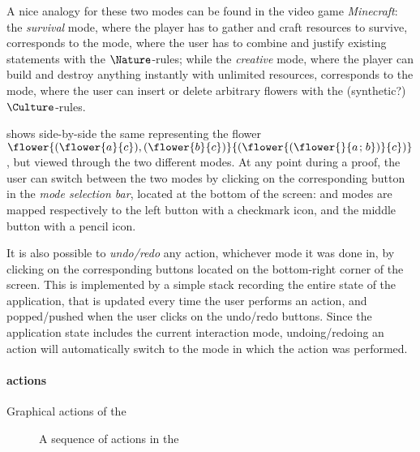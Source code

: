 \begin{scope}
\begin{remark}
  A nice analogy for these two modes can be found in the video game
  \emph{Minecraft}: the \emph{survival} mode, where the player has to gather and
  craft resources to survive, corresponds to the \Proof mode, where the user has
  to combine and justify existing statements with the  $\Nature$-rules;
  while the \emph{creative} mode, where the player can build and destroy
  anything instantly with unlimited resources, corresponds to the \Edit mode,
  where the user can insert or delete arbitrary flowers with the (synthetic?)
  $\Culture$-rules.
\end{remark}

 shows side-by-side the same  representing the
flower $\flower{(\flower{a}{c}),(\flower{b}{c})}{(\flower{(\flower{}{a \sep
b})}{c})}$, but viewed through the two different modes. At any point during a
proof, the user can switch between the two modes by clicking on the
corresponding button in the \emph{mode selection bar}, located at the bottom of
the screen: \Proof and \Edit modes are mapped respectively to the left button with
a checkmark icon, and the middle button with a pencil icon.

It is also possible to \emph{undo/redo} any action, whichever mode it was done
in, by clicking on the corresponding buttons located on the bottom-right corner
of the screen. This is implemented by a simple stack recording the entire state
of the application, that is updated every time the user performs an action, and
popped/pushed when the user clicks on the undo/redo buttons. Since the
application state includes the current interaction mode, undoing/redoing an
action will automatically switch to the mode in which the action was performed.

\paragraph{\Proof actions}

\begin{table*}[h]
  
  \caption{Graphical actions of the }
\end{table*}

\begin{figure*}[h]
  
  \caption{A sequence of \Proof actions in the }
\end{figure*}


\end{scope}
